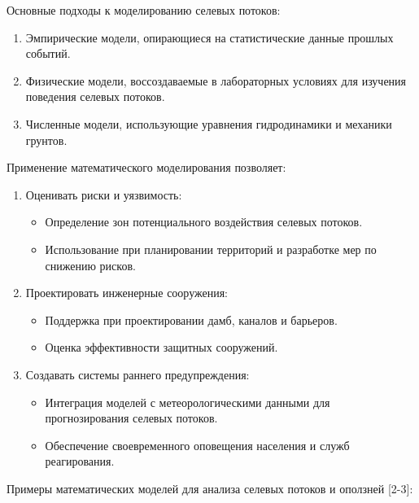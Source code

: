 \begin{multicols}{2}
Основные подходы к моделированию селевых потоков:

\begin{enumerate}[leftmargin=*]
\def\labelenumi{\arabic{enumi}.}
\item
  Эмпирические модели, опирающиеся на статистические данные прошлых
  событий.
\item
  Физические модели, воссоздаваемые в лабораторных условиях для изучения
  поведения селевых потоков.
\item
  Численные модели, использующие уравнения гидродинамики и механики
  грунтов.
\end{enumerate}

Применение математического моделирования позволяет:

\begin{enumerate}[leftmargin=*]
\def\labelenumi{\arabic{enumi}.}
\item
  Оценивать риски и уязвимость:

  \begin{itemize}
  \item
    Определение зон потенциального воздействия селевых потоков.
  \item
    Использование при планировании территорий и разработке мер по
    снижению рисков.
  \end{itemize}
\item
  Проектировать инженерные сооружения:

  \begin{itemize}
  \item
    Поддержка при проектировании дамб, каналов и барьеров.
  \item
    Оценка эффективности защитных сооружений.
  \end{itemize}
\item
  Создавать системы раннего предупреждения:

  \begin{itemize}
  \item
    Интеграция моделей с метеорологическими данными для прогнозирования
    селевых потоков.
  \end{itemize}

  \begin{itemize}
  \item
    Обеспечение своевременного оповещения населения и служб
    реагирования.
  \end{itemize}
\end{enumerate}

Примеры математических моделей для анализа селевых потоков и оползней
{[}2-3{]}:


\end{multicols}
